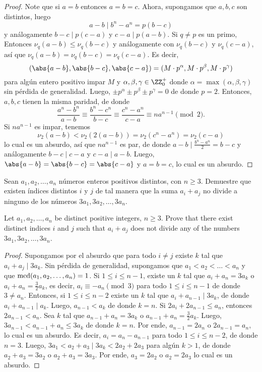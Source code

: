 \begin{proof}
  Note que si $a=b$ entonces $a=b=c$. Ahora, supongamos que $a,b,c$ son
  distintos, luego
  \[a-b\mid b^n-a^n=p(b-c)\]
  y análogamente $b-c\mid p(c-a)$ y $c-a\mid p(a-b)$. Si $q\ne p$ es un primo,
  Entonces $\nu_q(a-b)\le\nu_q(b-c)$ y análogamente con $\nu_q(b-c)$ y
  $\nu_q(c-a)$, así que $\nu_q(a-b)=\nu_q(b-c)=\nu_q(c-a)$. Es decir,
  \[
    (\abs{a-b},\abs{b-c},\abs{c-a})
    =(M\cdot p^\alpha,M\cdot p^\beta,M\cdot p^\gamma)
  \]
  para algún entero positivo impar $M$ y $\alpha,\beta,\gamma\in\ZZ^+_0$ donde
  $\alpha=\max(\alpha,\beta,\gamma)$ sin pérdida de generalidad. Luego,
  $\pm p^\alpha\pm p^\beta\pm p^\gamma=0$ de donde $p=2$. Entonces, $a,b,c$
  tienen la misma paridad, de donde
  \[
    \frac{a^n-b^n}{a-b}
    \equiv\frac{b^n-c^n}{b-c}
    \equiv\frac{c^n-a^n}{c-a}
    \equiv na^{n-1}\pmod 2.
  \]
  Si $na^{n-1}$ es impar, tenemos
  \[\nu_2(a-b)<\nu_2(2(a-b))=\nu_2(c^n-a^n)=\nu_2(c-a)\]
  lo cual es un absurdo, así que $na^{n-1}$ es par, de donde
  $a-b\mid\frac{b^n-a^n}{2}=b-c$ y análogamente $b-c\mid c-a$ y $c-a\mid a-b$.
  Luego, $\abs{a-b}=\abs{b-c}=\abs{c-a}$ y $a=b=c$, lo cual es un absurdo.
\end{proof}

\begin{probEG}[ISL 2008/N2]
  Sean $a_1,a_2,\dots,a_n$ números enteros positivos distintos, con $n\ge 3$.
  Demuestre que existen índices distintos $i$ y $j$ de tal manera que la suma
  $a_i+a_j$ no divide a ninguno de los números $3a_1,3a_2,\dots,3a_n$.
  \begin{hint}
    Let $a_1,a_2,\dots,a_n$ be distinct positive integers, $n\ge 3$. Prove that
    there exist distinct indices $i$ and $j$ such that $a_i+a_j$ does not divide
    any of the numbers $3a_1,3a_2,\dots,3a_n$.
  \end{hint}
\end{probEG}

\begin{proof}
  Supongamos por el absurdo que para todo $i\ne j$ existe $k$ tal que
  $a_i+a_j\mid 3a_k$. Sin pérdida de generalidad, supongamos que
  $a_1<a_2<\dots<a_n$ y que $\operatorname{mcd}(a_1,a_2,\dots,a_n)=1$. Si $1\le i\le n-1$,
  existe un $k$ tal que $a_i+a_n=3a_k$ o $a_i+a_n=\frac32a_k$, es decir,
  $a_i\equiv -a_n\pmod 3$ para todo $1\le i\le n-1$ de donde $3\ne a_n$.
  Entonces, si $1\le i\le n-2$ existe un $k$ tal que $a_i+a_{n-1}\mid 3a_k$, de
  donde $a_i+a_{n-1}\mid a_k$. Luego, $a_{n-1}<a_k$ de donde $k=n$. Si
  $2a_i+2a_{n-1}\le a_n$, entonces $2a_{n-1}<a_n$. Sea $k$ tal que
  $a_{n-1}+a_n=3a_k$ o $a_{n-1}+a_n=\frac32a_k$. Luego,
  $3a_{n-1}<a_{n-1}+a_n\le 3a_k$ de donde $k=n$. Por ende, $a_{n-1}=2a_n$ o
  $2a_{n-1}=a_n$, lo cual es un absurdo. Es decir, $a_i=a_n-a_{n-1}$ para todo
  $1\le i\le n-2$, de donde $n=3$. Luego, $3a_1<a_2+a_3\mid 3a_k<2a_2+2a_3$ para
  algún $k>1$, de donde $a_2+a_3=3a_2$ o $a_2+a_3=3a_3$. Por ende, $a_3=2a_2$ o
  $a_2=2a_3$ lo cual es un absurdo.
\end{proof}

